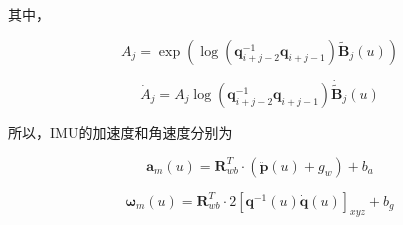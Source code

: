 \documentclass[12pt,a4paper]{article}
\begin{document}
其中，

\begin{equation}
A_j = 
\exp(\log(\mathbf{q}_{i+j-2}^{-1}\mathbf{q}_{i+j-1}) \tilde{\mathbf{B}}_j(u))
\end{equation}

\begin{equation}
\dot{A}_j = 
A_j \log(\mathbf{q}_{i+j-2}^{-1}\mathbf{q}_{i+j-1}) \dot{\tilde{\mathbf{B}}}_j(u)
\end{equation}

所以，IMU的加速度和角速度分别为

\begin{equation}
\mathbf{a}_m(u) =
\mathbf{R}_{wb}^T \cdot (\ddot{\mathbf{p}}(u) + g_w) + b_a
\end{equation}

\begin{equation}
\mathbf{\omega}_m(u) = 
\mathbf{R}_{wb}^T \cdot 2[\mathbf{q}^{-1}(u) \dot{\mathbf{q}}(u)]_{xyz} + b_g
\end{equation}



\end{document}
